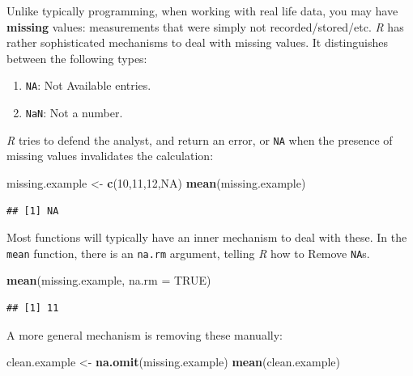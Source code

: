 \documentclass[]{book}
\newenvironment{Shaded}{\begin{snugshade}}{\end{snugshade}}
\newcommand{\DataTypeTok}[1]{\textcolor[rgb]{0.13,0.29,0.53}{#1}}
\newcommand{\DecValTok}[1]{\textcolor[rgb]{0.00,0.00,0.81}{#1}}
\newcommand{\KeywordTok}[1]{\textcolor[rgb]{0.13,0.29,0.53}{\textbf{#1}}}
\newcommand{\NormalTok}[1]{#1}
\newcommand{\OtherTok}[1]{\textcolor[rgb]{0.56,0.35,0.01}{#1}}
\newcommand{\StringTok}[1]{\textcolor[rgb]{0.31,0.60,0.02}{#1}}
\providecommand{\tightlist}{%
  \setlength{\itemsep}{0pt}\setlength{\parskip}{0pt}}
\theoremstyle{definition}
\theoremstyle{definition}
\theoremstyle{definition}
\theoremstyle{remark}
\begin{document}
Unlike typically programming, when working with real life data, you may have \textbf{missing} values: measurements that were simply not recorded/stored/etc.
\emph{R} has rather sophisticated mechanisms to deal with missing values.
It distinguishes between the following types:

\begin{enumerate}
\def\labelenumi{\arabic{enumi}.}
\tightlist
\item
  \texttt{NA}: Not Available entries.
\item
  \texttt{NaN}: Not a number.
\end{enumerate}

\emph{R} tries to defend the analyst, and return an error, or \texttt{NA} when the presence of missing values invalidates the calculation:

\begin{Shaded}
\begin{Highlighting}[]
\NormalTok{missing.example <-}\StringTok{ }\KeywordTok{c}\NormalTok{(}\DecValTok{10}\NormalTok{,}\DecValTok{11}\NormalTok{,}\DecValTok{12}\NormalTok{,}\OtherTok{NA}\NormalTok{)}
\KeywordTok{mean}\NormalTok{(missing.example)}
\end{Highlighting}
\end{Shaded}

\begin{verbatim}
## [1] NA
\end{verbatim}

Most functions will typically have an inner mechanism to deal with these. In the \texttt{mean} function, there is an \texttt{na.rm} argument, telling \emph{R} how to Remove \texttt{NA}s.

\begin{Shaded}
\begin{Highlighting}[]
\KeywordTok{mean}\NormalTok{(missing.example, }\DataTypeTok{na.rm =} \OtherTok{TRUE}\NormalTok{)}
\end{Highlighting}
\end{Shaded}

\begin{verbatim}
## [1] 11
\end{verbatim}

A more general mechanism is removing these manually:

\begin{Shaded}
\begin{Highlighting}[]
\NormalTok{clean.example <-}\StringTok{ }\KeywordTok{na.omit}\NormalTok{(missing.example)}
\KeywordTok{mean}\NormalTok{(clean.example)}
\end{Highlighting}
\end{Shaded}
\end{document}
